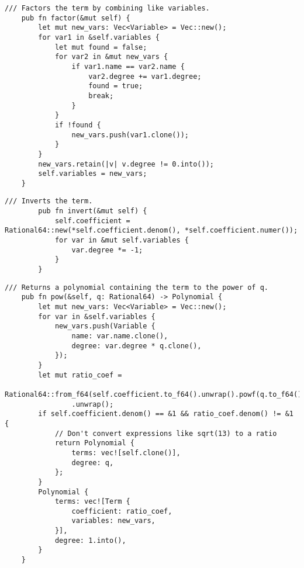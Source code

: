 \begin{lstlisting}[caption={The implementation of the \texttt{factor()} method for the \texttt{Term} struct}, label={lst:term-factor}]
    /// Factors the term by combining like variables.
    pub fn factor(&mut self) {
        let mut new_vars: Vec<Variable> = Vec::new();
        for var1 in &self.variables {
            let mut found = false;
            for var2 in &mut new_vars {
                if var1.name == var2.name {
                    var2.degree += var1.degree;
                    found = true;
                    break;
                }
            }
            if !found {
                new_vars.push(var1.clone());
            }
        }
        new_vars.retain(|v| v.degree != 0.into());
        self.variables = new_vars;
    }
\end{lstlisting}

\begin{minipage}{\linewidth}
    \begin{lstlisting}[caption={The implementation of the \texttt{invert()} method for the \texttt{Term} struct}, label={lst:term-invert}]
        /// Inverts the term.
        pub fn invert(&mut self) {
            self.coefficient = Rational64::new(*self.coefficient.denom(), *self.coefficient.numer());
            for var in &mut self.variables {
                var.degree *= -1;
            }
        }
    \end{lstlisting}
\end{minipage}

\begin{lstlisting}[caption={The implementation of the \texttt{pow()} method for the \texttt{Term} struct}, label={lst:term-pow}]
    /// Returns a polynomial containing the term to the power of q.
    pub fn pow(&self, q: Rational64) -> Polynomial {
        let mut new_vars: Vec<Variable> = Vec::new();
        for var in &self.variables {
            new_vars.push(Variable {
                name: var.name.clone(),
                degree: var.degree * q.clone(),
            });
        }
        let mut ratio_coef =
            Rational64::from_f64(self.coefficient.to_f64().unwrap().powf(q.to_f64().unwrap()))
                .unwrap();
        if self.coefficient.denom() == &1 && ratio_coef.denom() != &1 {
            // Don't convert expressions like sqrt(13) to a ratio
            return Polynomial {
                terms: vec![self.clone()],
                degree: q,
            };
        }
        Polynomial {
            terms: vec![Term {
                coefficient: ratio_coef,
                variables: new_vars,
            }],
            degree: 1.into(),
        }
    }
\end{lstlisting}

